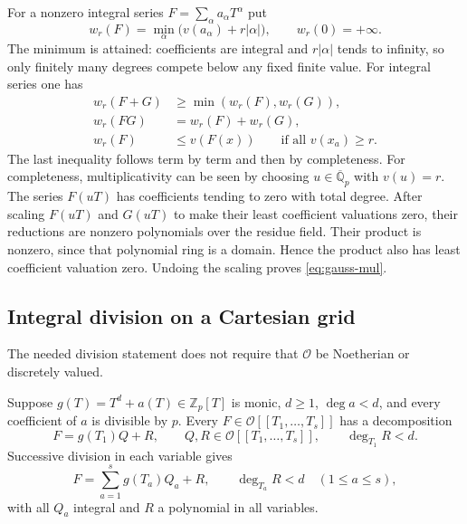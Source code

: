 For a nonzero integral series $F=\sum_\alpha a_\alpha T^\alpha$ put
\[
 w_r(F)=\min_\alpha\bigl(v(a_\alpha)+r|\alpha|\bigr),
 \qquad w_r(0)=+\infty.
\]
The minimum is attained: coefficients are integral and $r|\alpha|$ tends
to infinity, so only finitely many degrees compete below any fixed finite
value. For integral series one has
\begin{align}
 w_r(F+G)&\geq\min(w_r(F),w_r(G)),\label{eq:gauss-add}\\
 w_r(FG)&=w_r(F)+w_r(G),\label{eq:gauss-mul}\\
 w_r(F)&\leq v(F(x))\qquad\text{if all }v(x_a)\geq r.
 \label{eq:gauss-eval}
\end{align}
The last inequality follows term by term and then by completeness.
For completeness, multiplicativity can be seen by choosing
$u\in\overline{\mathbb Q}_p$ with $v(u)=r$. The series $F(uT)$ has
coefficients tending to zero with total degree. After scaling $F(uT)$ and
$G(uT)$ to make their least coefficient valuations zero, their reductions
are nonzero polynomials over the residue field. Their product is nonzero,
since that polynomial ring is a domain. Hence the product also has least
coefficient valuation zero. Undoing the scaling proves
\eqref{eq:gauss-mul}.

\subsection{Integral division on a Cartesian grid}

The needed division statement does not require that $\mathcal O$ be
Noetherian or discretely valued.

\begin{lemma}
\label{lem:division}
Suppose $g(T)=T^d+a(T)\in\mathbb Z_p[T]$ is monic, $d\geq1$,
$\deg a<d$, and every coefficient of $a$ is divisible by $p$. Every
$F\in\mathcal O[[T_1,\ldots,T_s]]$ has a decomposition
\[
 F=g(T_1)Q+R,\qquad Q,R\in\mathcal O[[T_1,\ldots,T_s]],
 \qquad\deg_{T_1}R<d.
\]
Successive division in each variable gives
\begin{equation}
 F=\sum_{a=1}^s g(T_a)Q_a+R,
 \qquad\deg_{T_a}R<d\quad(1\leq a\leq s),
 \label{eq:multidivision}
\end{equation}
with all $Q_a$ integral and $R$ a polynomial in all variables.
\end{lemma}

